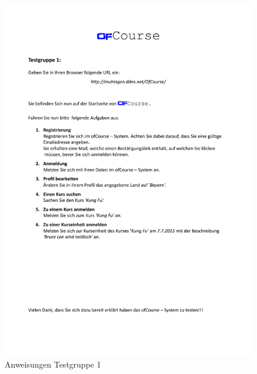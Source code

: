 \begin{figure}[h]
	\centering
	\includegraphics[width=0.9\linewidth, page=1]{pdf/AnweisungenTestgruppe1}
	\caption{Anweisungen Testgruppe 1}
	\label{fig:Anweisungen1}
\end{figure}
